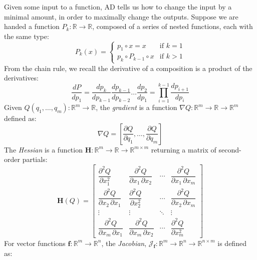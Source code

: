 \documentclass[12pt,initial,twoside,maitrise]{dms}
\numberwithin{equation}{section}
\numberwithin{table}{chapter}
\numberwithin{figure}{chapter}
\begin{document}
Given some input to a function, AD tells us how to change the input by a minimal amount, in order to maximally change the outputs. Suppose we are handed a function $P_k: \mathbb{R}\rightarrow\mathbb{R}$, composed of a series of nested functions, each with the same type:
%
\begin{equation}
    P_k(x) = \begin{cases} p_1 \circ x = x &\text{if } k=1\\ p_k\circ P_{k-1} \circ x&\text{if } k > 1 \end{cases}
\end{equation}
%
From the chain rule, we recall the derivative of a composition is a product of the derivatives:
%
\begin{equation} \label{eq:sfun_chain_rule}
    \frac{dP}{dp_1} = \frac{dp_k}{dp_{k-1}}\frac{dp_{k-1}}{dp_{k-2}}\dots\frac{dp_2}{dp_1}= {\displaystyle \prod_{i=1}^{k-1} \frac{dp_{i+1}}{dp_{i}}}
\end{equation}
%
Given $Q(q_1, \dots, q_m): \mathbb{R}^m\rightarrow\mathbb{R}$, the \textit{gradient} is a function $\nabla Q: \mathbb{R}^m\rightarrow\mathbb{R}\rightarrow\mathbb{R}^m$ defined as:
%
\begin{equation}
    \nabla Q = \left[ \frac{\partial Q}{\partial q_1}, \dots, \frac{\partial Q}{\partial q_m}\right]
\end{equation}
%
The \textit{Hessian} is a function $\mathbf{H}:\mathbb{R}^m\rightarrow\mathbb{R}\rightarrow\mathbb{R}^{m\times m}$ returning a matrix of second-order partials:
%
\begin{equation}
\mathbf{H}(Q) = \begin{bmatrix}{\dfrac {\partial ^{2}Q}{\partial x_{1}^{2}}}&{\dfrac {\partial ^{2}Q}{\partial x_{1}\,\partial x_{2}}}&\cdots &{\dfrac {\partial ^{2}Q}{\partial x_{1}\,\partial x_{m}}}\\[2.2ex]{\dfrac {\partial ^{2}Q}{\partial x_{2}\,\partial x_{1}}}&{\dfrac {\partial ^{2}Q}{\partial x_{2}^{2}}}&\cdots &{\dfrac {\partial ^{2}Q}{\partial x_{2}\,\partial x_{m}}}\\[2.2ex]\vdots &\vdots &\ddots &\vdots \\[2.2ex]{\dfrac {\partial ^{2}Q}{\partial x_{m}\,\partial x_{1}}}&{\dfrac {\partial ^{2}Q}{\partial x_{m}\,\partial x_{2}}}&\cdots &{\dfrac {\partial ^{2}Q}{\partial x_{m}^{2}}}\end{bmatrix}
\end{equation}
%
For vector functions $\mathbf{f}: \mathbb{R}^m\rightarrow\mathbb{R}^n$, the \textit{Jacobian}, $\mathcal{J}_{\mathbf{f}}: \mathbb{R}^m\rightarrow\mathbb{R}^n\rightarrow\mathbb{R}^{n \times m}$ is defined as:
\end{document}
